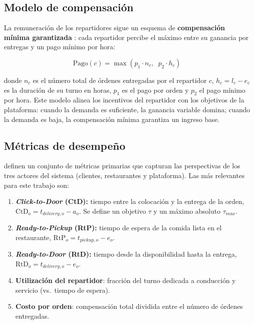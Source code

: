 \documentclass[12pt,letterpaper,oneside]{book}
\begin{document}
	\subsection{Modelo de compensación}

	La remuneración de los repartidores sigue un esquema de \textbf{compensación
	mínima garantizada} \citep{Reyes2018}: cada repartidor percibe el máximo entre
	su ganancia por entregas y un pago mínimo por hora:

	\begin{equation}
		\text{Pago}(c) = \max\!\left(p_1 \cdot n_c, \;\; p_2 \cdot h_c\right)
	\end{equation}

	\noindent donde $n_c$ es el número total de órdenes entregadas por el
	repartidor $c$, $h_c = l_c - e_c$ es la duración de su turno en horas, $p_1$ es el pago por orden y $p_2$ el pago mínimo por hora.
	Este modelo alinea los incentivos del repartidor con los objetivos de la
	plataforma: cuando la demanda es suficiente, la ganancia variable domina;
	cuando la demanda es baja, la compensación mínima garantiza un ingreso base.

	\subsection{Métricas de desempeño}

	\citet{Reyes2018} definen un conjunto de métricas primarias que capturan las
	perspectivas de los tres actores del sistema (clientes, restaurantes y
	plataforma).  Las más relevantes para este trabajo son:

	\begin{enumerate}
		\item \textbf{\textit{Click-to-Door} (CtD):} tiempo entre la colocación y la
		      entrega de la orden, $\text{CtD}_o = t_{delivery,o} - a_o$.  Se
		      define un objetivo $\tau$ y un máximo absoluto $\tau_{max}$.

		\item \textbf{\textit{Ready-to-Pickup} (RtP):} tiempo de espera de la comida lista
		      en el restaurante, $\text{RtP}_o = t_{pickup,o} - e_o$.

		\item \textbf{\textit{Ready-to-Door} (RtD):} tiempo desde la disponibilidad hasta
		      la entrega, $\text{RtD}_o = t_{delivery,o} - e_o$.

		\item \textbf{Utilización del repartidor}: fracción del turno dedicada a
		      conducción y servicio (vs.\ tiempo de espera).

		\item \textbf{Costo por orden}: compensación total dividida entre el
		      número de órdenes entregadas.
	\end{enumerate}
\end{document}

